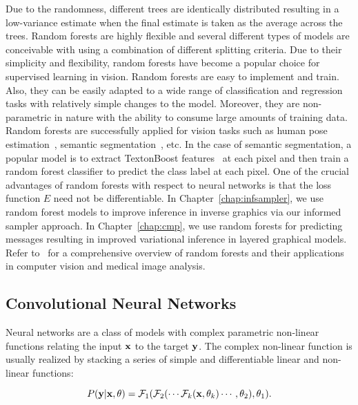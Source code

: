 Due to the randomness, different trees are identically distributed
resulting in a low-variance estimate when the final estimate is taken as the average
across the trees.
Random forests are highly flexible and several different types of models are
conceivable with using a combination of different splitting criteria.
Due to their simplicity and flexibility, random forests have become a popular
choice for supervised learning in vision.
Random forests are easy to implement and train. Also, they can be easily adapted
to a wide range of classification and regression tasks with relatively simple
changes to the model. Moreover, they are non-parametric in
nature with the ability to consume large amounts of training data.
Random forests are successfully applied for vision tasks such as
human pose estimation~\cite{shotton2011kinect}, semantic segmentation~\cite{shotton2008semantic}, etc.
In the case of semantic segmentation, a popular model is to extract TextonBoost
features~\cite{shotton2006textonboost}
at each pixel and then train a random forest classifier to predict the class
label at each pixel.
One of the crucial advantages of random forests with respect
to neural networks is that the loss function $E$ need not be differentiable.
In Chapter~\ref{chap:infsampler}, we use random forest models
to improve inference in inverse graphics via our informed
sampler approach. In Chapter~\ref{chap:cmp}, we use random forests
for predicting messages resulting in improved variational inference in
layered graphical models. Refer to~\cite{Criminisi2013} for a comprehensive
overview of random forests and their applications in computer vision and medical
image analysis.

\subsection{Convolutional Neural Networks}
\label{sec:cnn}

Neural networks are a class of models with complex parametric non-linear
functions relating the input $\mathbf{x}$ to the target $\mathbf{y}$. The complex non-linear
function is usually realized by stacking a series of simple and differentiable
linear and non-linear functions:

\begin{equation}
P(\mathbf{y}|\mathbf{x},\mathbf{\theta}) = \mathcal{F}_1(\mathcal{F}_2(\cdots \mathcal{F}_k(\mathbf{x},\theta_k)\cdots, \mathbf{\theta}_2),\mathbf{\theta}_1).
\end{equation}

